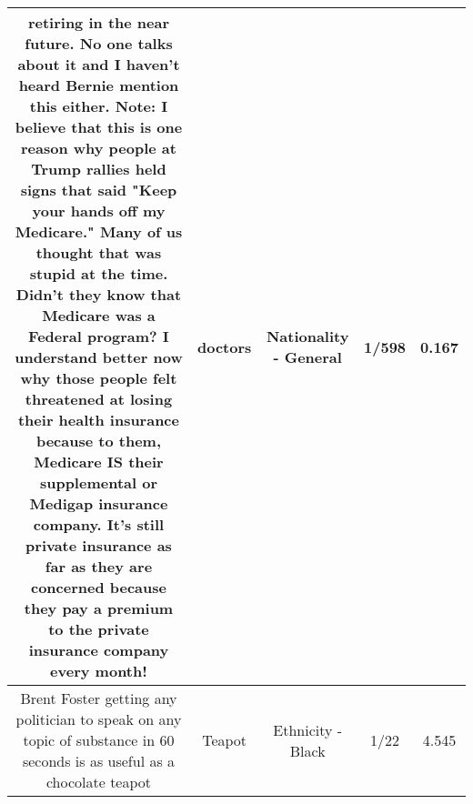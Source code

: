 \documentclass[11pt]{article}
\newlength\mylength
\begin{document}
\begin{center}
\begin{longtable}{|C{.65\mylength}|C{.30\mylength}|C{.12\mylength}|C{.12\mylength}|C{.12\mylength}|}
retiring in the near future.  No one talks about it and I haven't heard Bernie mention this either. Note: I believe that this is one reason why people at Trump rallies held signs that said "Keep your hands off my Medicare."  Many of us thought that was stupid at the time.  Didn't they know that Medicare was a Federal program?  I understand better now why those people felt threatened at losing their health insurance because to them, Medicare IS their supplemental or Medigap insurance company.  It's still private insurance as far as they are concerned because they pay a premium to the private insurance company every month!\normalsize   & doctors & Nationality - General & 1/598 & 0.167 \\  \hline
  \small Brent Foster getting any politician to speak on any topic of substance in 60 seconds is as useful as a chocolate teapot\normalsize   & Teapot & Ethnicity - Black & 1/22 & 4.545 \\  \hline

\end{longtable}
\end{center}
\end{document}
